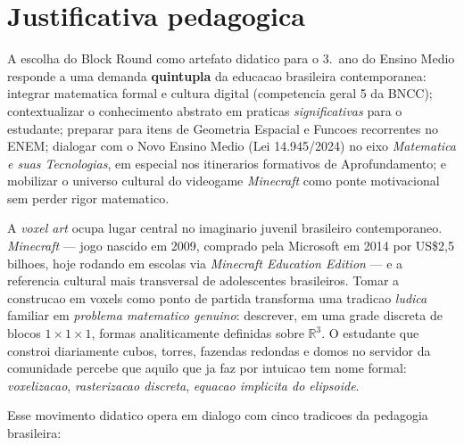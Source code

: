 \documentclass[12pt,a4paper]{scrartcl}
\newcommand{\acc}[1]{\textcolor{accent}{\textbf{#1}}}
\begin{document}
\section{Justificativa pedagogica}\label{sec:justificativa}

A escolha do Block Round como artefato didatico para o 3.\textordmasculine\ ano do Ensino Medio responde a uma demanda \acc{quintupla} da educacao brasileira contemporanea: integrar matematica formal e cultura digital (competencia geral 5 da BNCC); contextualizar o conhecimento abstrato em praticas \emph{significativas} para o estudante; preparar para itens de Geometria Espacial e Funcoes recorrentes no ENEM; dialogar com o Novo Ensino Medio (Lei 14.945/2024) no eixo \emph{Matematica e suas Tecnologias}, em especial nos itinerarios formativos de Aprofundamento; e mobilizar o universo cultural do videogame \emph{Minecraft} como ponte motivacional sem perder rigor matematico.

A \emph{voxel art} ocupa lugar central no imaginario juvenil brasileiro contemporaneo. \emph{Minecraft} --- jogo nascido em 2009, comprado pela Microsoft em 2014 por US\$2{,}5 bilhoes, hoje rodando em escolas via \emph{Minecraft Education Edition} --- e a referencia cultural mais transversal de adolescentes brasileiros. Tomar a construcao em voxels como ponto de partida transforma uma tradicao \emph{ludica} familiar em \emph{problema matematico genuino}: descrever, em uma grade discreta de blocos $1\times1\times1$, formas analiticamente definidas sobre $\mathbb{R}^3$. O estudante que constroi diariamente cubos, torres, fazendas redondas e domos no servidor da comunidade percebe que aquilo que ja faz por intuicao tem nome formal: \emph{voxelizacao}, \emph{rasterizacao discreta}, \emph{equacao implicita do elipsoide}.

Esse movimento didatico opera em dialogo com cinco tradicoes da pedagogia brasileira:
\end{document}

